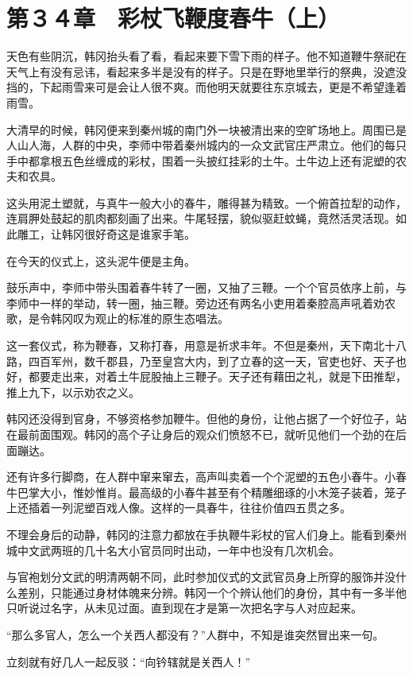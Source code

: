 \section{第３４章　彩杖飞鞭度春牛（上）}

天色有些阴沉，韩冈抬头看了看，看起来要下雪下雨的样子。他不知道鞭牛祭祀在天气上有没有忌讳，看起来多半是没有的样子。只是在野地里举行的祭典，没遮没挡的，下起雨雪来可是会让人很不爽。而他明天就要往东京城去，更是不希望逢着雨雪。

大清早的时候，韩冈便来到秦州城的南门外一块被清出来的空旷场地上。周围已是人山人海，人群的中央，李师中带着秦州城内的一众文武官庄严肃立。他们的每只手中都拿根五色丝缠成的彩杖，围着一头披红挂彩的土牛。土牛边上还有泥塑的农夫和农具。

这头用泥土塑就，与真牛一般大小的春牛，雕得甚为精致。一个俯首拉犁的动作，连肩胛处鼓起的肌肉都刻画了出来。牛尾轻摆，貌似驱赶蚊蝇，竟然活灵活现。如此雕工，让韩冈很好奇这是谁家手笔。

在今天的仪式上，这头泥牛便是主角。

鼓乐声中，李师中带头围着春牛转了一圈，又抽了三鞭。一个个官员依序上前，与李师中一样的举动，转一圈，抽三鞭。旁边还有两名小吏用着秦腔高声吼着劝农歌，是令韩冈叹为观止的标准的原生态唱法。

这一套仪式，称为鞭春，又称打春，用意是祈求丰年。不但是秦州，天下南北十八路，四百军州，数千郡县，乃至皇宫大内，到了立春的这一天，官吏也好、天子也好，都要走出来，对着土牛屁股抽上三鞭子。天子还有藉田之礼，就是下田推犁，推上九下，以示劝农之义。

韩冈还没得到官身，不够资格参加鞭牛。但他的身份，让他占据了一个好位子，站在最前面围观。韩冈的高个子让身后的观众们愤怒不已，就听见他们一个劲的在后面蹦达。

还有许多行脚商，在人群中窜来窜去，高声叫卖着一个个泥塑的五色小春牛。小春牛巴掌大小，惟妙惟肖。最高级的小春牛甚至有个精雕细琢的小木笼子装着，笼子上还插着一列泥塑百戏人像。这样的一具春牛，往往价值四五贯之多。

不理会身后的动静，韩冈的注意力都放在手执鞭牛彩杖的官人们身上。能看到秦州城中文武两班的几十名大小官员同时出动，一年中也没有几次机会。

与官袍划分文武的明清两朝不同，此时参加仪式的文武官员身上所穿的服饰并没什么差别，只能通过身材体魄来分辨。韩冈一个个辨认他们的身份，其中有一多半他只听说过名字，从未见过面。直到现在才是第一次把名字与人对应起来。

“那么多官人，怎么一个关西人都没有？”人群中，不知是谁突然冒出来一句。

立刻就有好几人一起反驳：“向钤辖就是关西人！”


